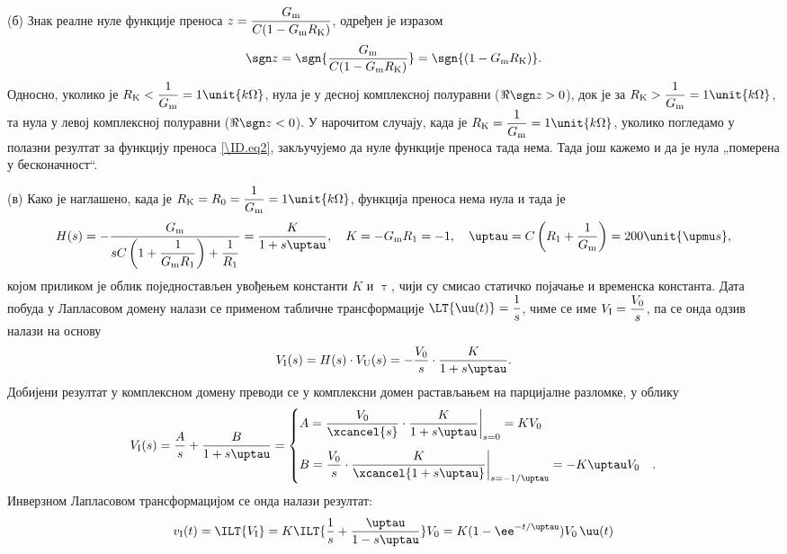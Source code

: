 (б) Знак реалне нуле функције преноса $z = \dfrac{G_{\rm m}}{C(1 - G_{\rm m} R_{\rm K})}$, одређен је изразом
\begin{equation}
    \sgn z = \sgn {\dfrac{G_{\rm m}}{C(1 - G_{\rm m} R_{\rm K})}} = \sgn{(1 - G_{\rm m} R_{\rm K})}.
\end{equation}
Односно, уколико је $R_{\rm K} < \dfrac{1}{G_{\rm m}} = 1\unit{k\Omega}$, нула је у десној комплексној полуравни ($\Re{\sgn z} > 0$), док је 
за $R_{\rm K} > \dfrac{1}{G_{\rm m}} = 1\unit{k\Omega}$, та нула у левој комплексној полуравни ($\Re {\sgn z} < 0$). У нарочитом случају, 
када је $R_{\rm K} = \dfrac{1}{G_{\rm m}} = 1\unit{k\Omega}$, уколико погледамо у полазни резултат за функцију преноса \ref{\ID.eq2}, закључујемо да нуле функције преноса 
тада нема. Тада још кажемо и да је нула „померена у бесконачност“.

(в) Како је наглашено, када је $R_{\rm K} = R_0 = \dfrac{1}{G_{\rm m}} = 1\unit{k\Omega}$, функција преноса нема нула и тада је 
\small
\begin{equation}
    H(s) = - \dfrac{G_{\rm m} }{ sC\left(1 + \dfrac{1}{G_{\rm m} R_1}\right) + \dfrac{1}{R_1} } 
    = \dfrac{K}{1 + s\uptau}, \quad K = -G_{\rm m}{R_1} = -1, \quad \uptau = C\left( R_1 + \dfrac{1}{G_{\rm m}} \right) = 200\unit{\upmu s},
\end{equation}
\normalsize
којом приликом је облик поједностављен увођењем константи $K$ и $\uptau$, чији су смисао статичко појачање и временска константа.  
Дата побуда у Лапласовом домену налази се применом табличне трансформације 
$\LT{\uu(t)} = \dfrac{1}{s}$, чиме се име $V_{\rm I} = \dfrac{V_0}{s}$, па се онда одзив налази на основу 
\begin{eqnarray}
    V_{\rm I}(s) = H(s) \cdot V_{\rm U}(s) = - \dfrac{V_{0}}{s} \cdot \dfrac{K}{1 + s\uptau}.
\end{eqnarray}
Добијени резултат у комплексном домену преводи се у комплексни домен растављањем на парцијалне разломке, у облику 
\begin{eqnarray} 
    V_{\rm I}(s) = \dfrac{A}{s} + \dfrac{B}{1 + s\uptau} = 
    \begin{cases}
        A = \dfrac{V_{0}}{\xcancel{s}} \cdot  \dfrac{K}{1 + s\uptau}  \bigg|_{s = 0} = 
        K V_0 & \\[5mm]
        B =  
        \dfrac{V_{0}}{s} \cdot  \dfrac{K}{\xcancel{1 + s\uptau}}  \bigg|_{s = -1/\uptau} = -K \uptau V_0
        &.
    \end{cases}
\end{eqnarray}
Инверзном Лапласовом трансформацијом се онда налази резултат: 
\begin{equation}
    v_{\rm I}(t) = \ILT{V_{\rm I}} = K \ILT{ \dfrac{1}{s} + \dfrac{\uptau}{1 - s\uptau} } V_0 = 
    {K}(1 - \ee^{-t/\uptau} ) V_0 \, \uu(t)
\end{equation}

